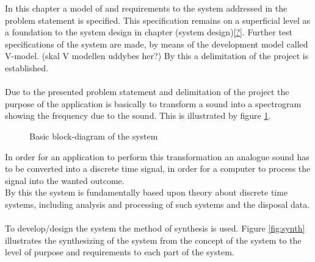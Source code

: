 In this chapter a model of and requirements to the system addressed in the problem statement is specified. This specification remains on a superficial level as a foundation to the system design in chapter (system design)\ref{?}. Further test specifications of the system are made, by means of the development model called V-model. (skal V modellen uddybes her?) By this a delimitation of the project is established. \\   
\\
Due to the presented problem statement and delimitation of the project the purpose of the application is basically to transform a sound into a spectrogram showing the frequency due to the sound. This is illustrated by figure \ref{fig:model1}.    
\begin{figure}[h]
\centering
{}
\caption{Basic block-diagram of the system}
\label{fig:model1}
\end{figure}
In order for an application to perform this transformation an analogue sound has to be converted into a discrete time signal, in order for a computer to process the signal into the wanted outcome. \\
By this the system is fundamentally based upon theory about discrete time systems, including analysis and processing of such systems and the disposal data. \\
\\
To develop/design the system the method of synthesis is used. Figure \ref{fig:synth} illustrates the synthesizing of the system from the concept of the system to the level of purpose and requirements to each part of the system.  

